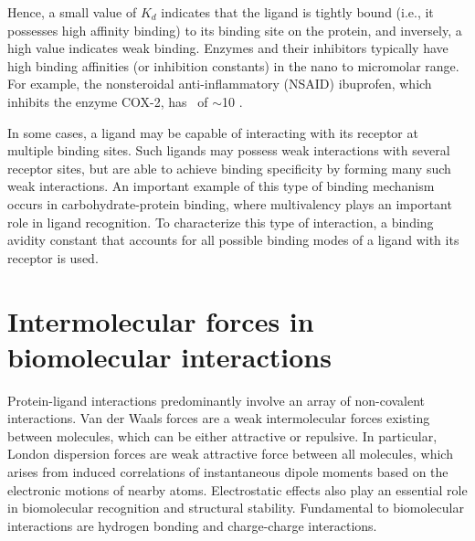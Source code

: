 Hence, a small value of $K_{d}$ indicates that the ligand is tightly bound (i.e., it possesses high affinity binding) to its binding site on the protein, and inversely, a high value indicates weak binding. Enzymes and their inhibitors typically have high binding affinities (or inhibition constants) in the nano to micromolar range. For example, the nonsteroidal anti-inflammatory (NSAID) ibuprofen, which inhibits the enzyme COX-2, has \KD\ of $\sim$10 \micromolar.\cite{Cryer:1998ti} 

In some cases, a ligand may be capable of interacting with its receptor at multiple binding sites. Such ligands may possess weak interactions with several receptor sites, but are able to achieve binding specificity by forming many such weak interactions. An important example of this type of binding mechanism occurs in carbohydrate-protein binding, where multivalency plays an important role in ligand recognition. To characterize this type of interaction, a binding avidity constant that accounts for all possible binding modes of a ligand with its receptor is used.\cite{Krishnamurthy:2006vi}

\section{Intermolecular forces in biomolecular interactions}



Protein-ligand interactions predominantly involve an array of non-covalent interactions.  Van der Waals forces are a weak intermolecular forces existing between molecules, which can be either attractive or repulsive. In particular, London dispersion forces are weak attractive force between all molecules, which arises from induced correlations of instantaneous dipole moments based on the electronic motions of nearby atoms. Electrostatic effects also play an essential role in biomolecular recognition and structural stability. Fundamental to biomolecular interactions are hydrogen bonding and charge-charge interactions.\cite{Nakamura:1996vm}

